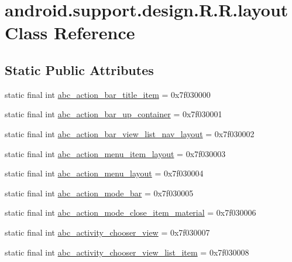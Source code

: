 \hypertarget{classandroid_1_1support_1_1design_1_1_r_1_1layout}{
\section{android.support.design.R.R.layout Class Reference}
\label{classandroid_1_1support_1_1design_1_1_r_1_1layout}
}
\subsection*{Static Public Attributes}
\begin{CompactItemize}
\item 
static final int \hyperlink{classandroid_1_1support_1_1design_1_1_r_1_1layout_7de5fb7982f76f0c745d56080e36242d}{abc\_\-action\_\-bar\_\-title\_\-item} = 0x7f030000
\item 
static final int \hyperlink{classandroid_1_1support_1_1design_1_1_r_1_1layout_9f6d65fb6bb3984fc70b31779d6278e5}{abc\_\-action\_\-bar\_\-up\_\-container} = 0x7f030001
\item 
static final int \hyperlink{classandroid_1_1support_1_1design_1_1_r_1_1layout_a0d9b86e1002cf9e98ca6ced0beda068}{abc\_\-action\_\-bar\_\-view\_\-list\_\-nav\_\-layout} = 0x7f030002
\item 
static final int \hyperlink{classandroid_1_1support_1_1design_1_1_r_1_1layout_881c5de1933f787de045182bf380aee8}{abc\_\-action\_\-menu\_\-item\_\-layout} = 0x7f030003
\item 
static final int \hyperlink{classandroid_1_1support_1_1design_1_1_r_1_1layout_ea9e54eba2be2cb91f5f4d9e66f28186}{abc\_\-action\_\-menu\_\-layout} = 0x7f030004
\item 
static final int \hyperlink{classandroid_1_1support_1_1design_1_1_r_1_1layout_bd5090c38d55096f09e41df9705210b3}{abc\_\-action\_\-mode\_\-bar} = 0x7f030005
\item 
static final int \hyperlink{classandroid_1_1support_1_1design_1_1_r_1_1layout_1e9e49d53d58f4553df57f83f263a48f}{abc\_\-action\_\-mode\_\-close\_\-item\_\-material} = 0x7f030006
\item 
static final int \hyperlink{classandroid_1_1support_1_1design_1_1_r_1_1layout_f6c958cc798500692793d4a574746fcc}{abc\_\-activity\_\-chooser\_\-view} = 0x7f030007
\item 
static final int \hyperlink{classandroid_1_1support_1_1design_1_1_r_1_1layout_99cf906f1b7c613c6a1e0e0a0cc1cfd8}{abc\_\-activity\_\-chooser\_\-view\_\-list\_\-item} = 0x7f030008

\end{CompactItemize}
